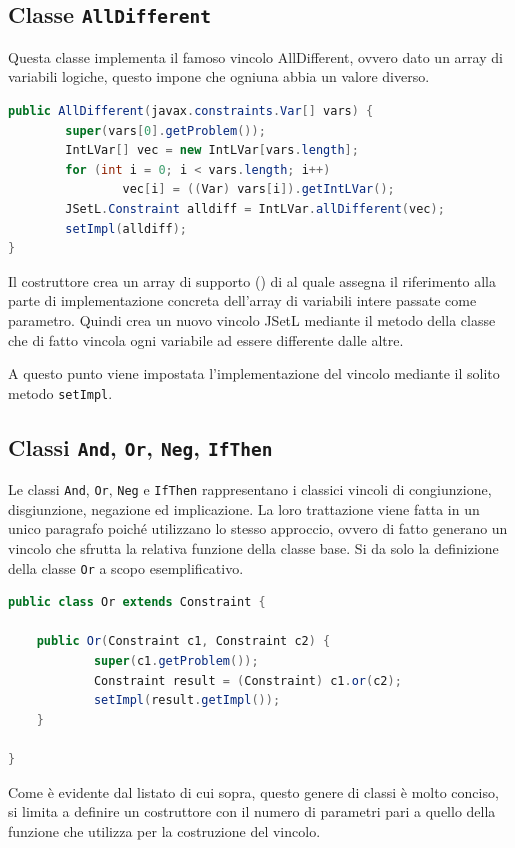 \subsection{Classe \texttt{AllDifferent}}\label{AllDifferent}
Questa classe implementa il famoso vincolo AllDifferent, ovvero dato un array
di variabili logiche, questo impone che ogniuna abbia un valore diverso. 
\begin{lstlisting}[language = Java,
                   caption = {\files{postAllDiff}.}
                  ]
public AllDifferent(javax.constraints.Var[] vars) {
        super(vars[0].getProblem());
        IntLVar[] vec = new IntLVar[vars.length];
        for (int i = 0; i < vars.length; i++)
                vec[i] = ((Var) vars[i]).getIntLVar();
        JSetL.Constraint alldiff = IntLVar.allDifferent(vec);
        setImpl(alldiff);
}
\end{lstlisting}
Il costruttore crea un array di supporto () di  al 
quale
assegna il riferimento alla parte di implementazione concreta dell'array
di variabili intere passate come parametro. Quindi crea un nuovo vincolo JSetL
mediante il metodo  della classe  che di
fatto vincola ogni variabile ad essere differente dalle altre.

A questo punto viene impostata l'implementazione del vincolo
mediante il solito metodo \texttt{setImpl}.


\subsection{Classi \texttt{And}, \texttt{Or}, \texttt{Neg}, \texttt{IfThen}}
Le classi \texttt{And}, \texttt{Or}, \texttt{Neg} e \texttt{IfThen} 
rappresentano i classici vincoli di congiunzione, disgiunzione, negazione ed
implicazione. La loro trattazione viene fatta in un unico paragrafo poiché
utilizzano lo stesso approccio, ovvero di fatto generano un vincolo
che sfrutta la relativa funzione della classe base. Si da solo la definizione
della classe \texttt{Or} a scopo esemplificativo.
\begin{lstlisting}[language = Java,
                   caption = {Classe \texttt{Or}.}]
public class Or extends Constraint {

    public Or(Constraint c1, Constraint c2) {
            super(c1.getProblem());
            Constraint result = (Constraint) c1.or(c2);
            setImpl(result.getImpl());
    }

}
\end{lstlisting}
Come è evidente dal listato di cui sopra, questo genere di classi è molto
conciso, si limita a definire un costruttore con il numero di parametri pari
a quello della funzione che utilizza per la costruzione del vincolo. 

